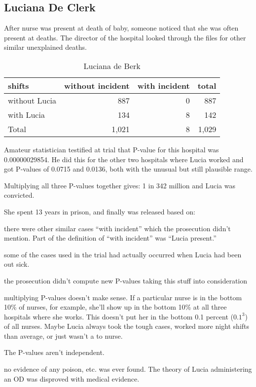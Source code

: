 \documentclass[landscape]{exam}
\begin{document}
  \subsection{Luciana De Clerk}

  After nurse was present at death of baby, someone noticed that she was often
  present at deaths. The director of the hospital looked through the files for
  other similar unexplained deaths. 

  \begin{table}[H]
    \centering
    \begin{tabular}{lrrr}
      \toprule
      shifts        & without incident & with incident & total \\
      \midrule
      without Lucia & 887              & 0             & 887 \\
      with Lucia    & 134              & 8             & 142 \\
      Total         & 1,021            & 8             & 1,029 \\
      \bottomrule
    \end{tabular}
    \caption{Luciana de Berk}
    \label{tab:ldb1}
  \end{table}

  Amateur statistician testified at trial that P-value for this hospital was
  0.00000029854. He did this for the other two hospitals where Lucia worked and
  got P-values of 0.0715 and 0.0136, both with the unusual but still plausible
  range.

  Multiplying all three P-values together gives: 1 in 342 million and Lucia was
  convicted.

  She spent 13 years in prison, and finally was released based on:
  \begin{itemize*}

    \item there were other similar cases ``with incident'' which the prosecution
      didn't mention. Part of the definition of ``with incident'' was ``Lucia
      present.''

    \item some of the cases used in the trial had actually occurred when Lucia
      had been out sick.

    \item the prosecution didn't compute new P-values taking this stuff into
      consideration

    \item multiplying P-values doesn't make sense. If a particular nurse is in
      the bottom 10\% of nurses, for example, she'll show up in the bottom 10\%
      at all three hospitals where she works. This doesn't put her in the bottom
      0.1 percent ($0.1^3$) of all nurses. Maybe Lucia always took the tough
      cases, worked more night shifts than average, or just wasn't a to nurse.

      The P-values aren't independent.

    \item no evidence of any poison, etc. was ever found. The theory of Lucia
      administering an OD was disproved with medical evidence. 
  \end{itemize*}
\end{document}
